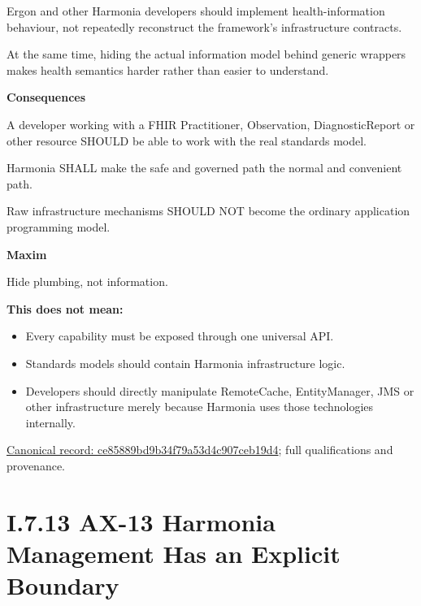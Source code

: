 Ergon and other Harmonia developers should
implement health-information behaviour, not repeatedly reconstruct the
framework's infrastructure contracts.



At the same time, hiding the actual information model behind generic
wrappers makes health semantics harder rather than easier to understand.



\par\medskip\textbf{Consequences}\par


A developer working with a FHIR Practitioner, Observation,
DiagnosticReport or other resource SHOULD be able to work with the real
standards model.



Harmonia SHALL make the safe and governed path the normal and convenient
path.



Raw infrastructure mechanisms SHOULD NOT become the ordinary application
programming model.



\par\medskip\textbf{Maxim}\par


Hide plumbing, not information.



\textbf{This does not mean:}



\begin{itemize}


\item Every capability must be exposed through one universal API.

\item Standards models should contain Harmonia infrastructure logic.

\item Developers should directly manipulate RemoteCache, EntityManager, JMS or other infrastructure merely because Harmonia uses those technologies internally.

\end{itemize}

{\footnotesize \href{../../../../continuum/motivation/principle/ce85889bd9b34f79a53d4c907ceb19d4.md}{Canonical record: ce85889bd9b34f79a53d4c907ceb19d4}; full qualifications and provenance.}\par
\section*{I.7.13 AX-13 Harmonia Management Has an Explicit Boundary}
\label{navigation:I.7.13}

